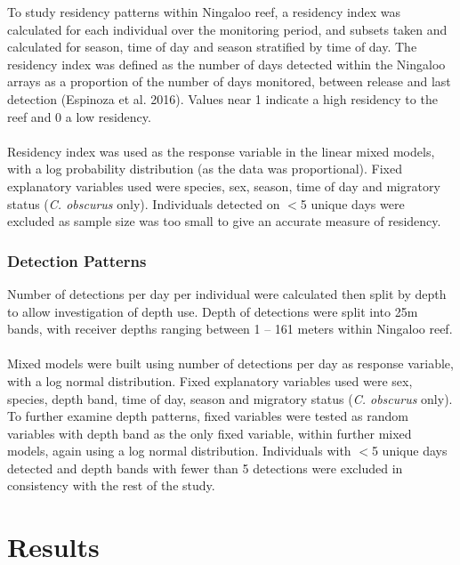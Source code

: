 \documentclass[11pt,a4paper]{article}
\begin{document}
	To study residency patterns within Ningaloo reef, a residency index was calculated for each individual over the monitoring period, and subsets taken and calculated for season, time of day and season stratified by time of day. The residency index was defined as the number of days detected within the Ningaloo arrays as a proportion of the number of days monitored, between release and last detection (Espinoza et al. 2016). Values near 1 indicate a high residency to the reef and 0 a low residency. \\
	\\
	Residency index was used as the response variable in the linear mixed models, with a log probability distribution (as the data was proportional). Fixed explanatory variables used were species, sex, season, time of day and migratory status (\textit{C. obscurus} only). Individuals detected on $<$5 unique days were excluded as sample size was too small to give an accurate measure of residency. \\
	
	
	\subsubsection{Detection Patterns}
	
	Number of detections per day per individual were calculated then split by depth to allow investigation of depth use. Depth of detections were split into 25m bands, with receiver depths ranging between 1 – 161 meters within Ningaloo reef. \\
	\\
	Mixed models were built using number of detections per day as response variable, with a log normal distribution. Fixed explanatory variables used were sex, species, depth band, time of day, season and migratory status (\textit{C. obscurus} only). To further examine depth patterns, fixed variables were tested as random variables with depth band as the only fixed variable, within further mixed models, again using a log normal distribution. Individuals with $<$5 unique days detected and depth bands with fewer than 5 detections were excluded in consistency with the rest of the study.\\
	
	
	\newpage
	
	\section{Results}
	
\end{document}
